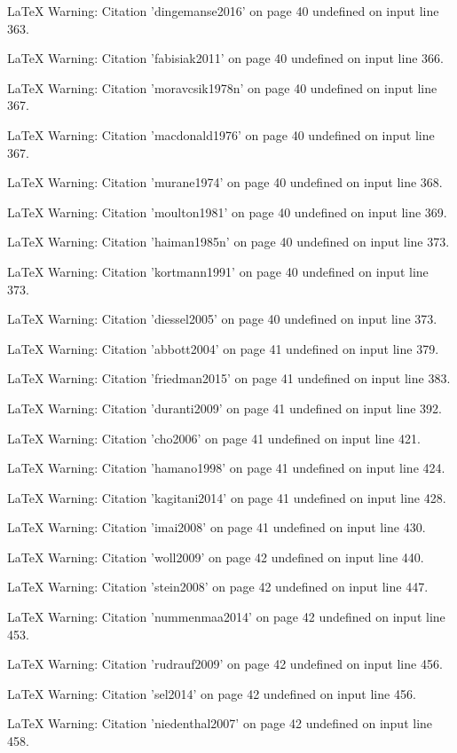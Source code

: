 LaTeX Warning: Citation 'dingemanse2016' on page 40 undefined on input line 363.


LaTeX Warning: Citation 'fabisiak2011' on page 40 undefined on input line 366.


LaTeX Warning: Citation 'moravcsik1978n' on page 40 undefined on input line 367.


LaTeX Warning: Citation 'macdonald1976' on page 40 undefined on input line 367.


LaTeX Warning: Citation 'murane1974' on page 40 undefined on input line 368.


LaTeX Warning: Citation 'moulton1981' on page 40 undefined on input line 369.


LaTeX Warning: Citation 'haiman1985n' on page 40 undefined on input line 373.


LaTeX Warning: Citation 'kortmann1991' on page 40 undefined on input line 373.


LaTeX Warning: Citation 'diessel2005' on page 40 undefined on input line 373.


LaTeX Warning: Citation 'abbott2004' on page 41 undefined on input line 379.


LaTeX Warning: Citation 'friedman2015' on page 41 undefined on input line 383.


LaTeX Warning: Citation 'duranti2009' on page 41 undefined on input line 392.


LaTeX Warning: Citation 'cho2006' on page 41 undefined on input line 421.


LaTeX Warning: Citation 'hamano1998' on page 41 undefined on input line 424.


LaTeX Warning: Citation 'kagitani2014' on page 41 undefined on input line 428.


LaTeX Warning: Citation 'imai2008' on page 41 undefined on input line 430.


LaTeX Warning: Citation 'woll2009' on page 42 undefined on input line 440.


LaTeX Warning: Citation 'stein2008' on page 42 undefined on input line 447.


LaTeX Warning: Citation 'nummenmaa2014' on page 42 undefined on input line 453.


LaTeX Warning: Citation 'rudrauf2009' on page 42 undefined on input line 456.


LaTeX Warning: Citation 'sel2014' on page 42 undefined on input line 456.


LaTeX Warning: Citation 'niedenthal2007' on page 42 undefined on input line 458.


